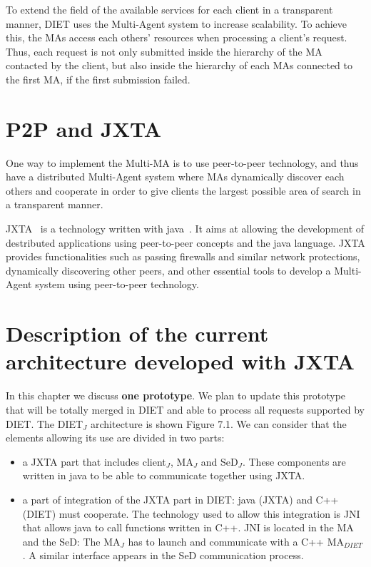 To extend the field of the available services for each client in a
transparent manner, DIET uses the Multi-Agent system to increase
scalability. To achieve this, the MAs access each others' resources
when processing a client's request. Thus, each request is not only
submitted inside the hierarchy of the MA contacted by the client, but
also inside the hierarchy of each MAs connected to the first MA, if the
first submission failed.

\section{P2P and JXTA}
\label{sec:JXTA}

One way to implement the Multi-MA is to use peer-to-peer technology,
and thus have a distributed Multi-Agent system where MAs dynamically
discover each others and cooperate in order to give clients the largest
possible area of search in a transparent manner.

JXTA~\cite{JXTA} is a technology written with java~\cite{java}. It
aims at allowing the development of destributed applications using
peer-to-peer concepts and the java language. JXTA provides
functionalities such as passing firewalls and similar network
protections, dynamically discovering other peers, and other essential
tools to develop a Multi-Agent system using peer-to-peer technology.

\section{Description of the current architecture developed with JXTA}
\label{sec:archi}

In this chapter we discuss \textbf{one prototype}. We plan to update
this prototype that will be totally merged in DIET and able to process
all requests supported by DIET. The DIET$_{J}$ architecture is shown
Figure 7.1.  We can consider that the elements allowing its use are
divided in two parts:

\begin{itemize}
\item{a JXTA part that includes client$_{J}$, MA$_{J}$ and
    SeD$_{J}$. These components are written in java to be able to
    communicate together using JXTA.}
  
\item{a part of integration of the JXTA part in DIET: java (JXTA) and
    C++ (DIET) must cooperate. The technology used to allow this
    integration is JNI~\cite{JNI} that allows java to call functions
    written in C++. JNI is located in the MA and the SeD: The
    MA$_{J}$ has to launch and communicate with a C++ MA$_{DIET}$.
    A similar interface appears in the SeD communication process.}
\end{itemize}


